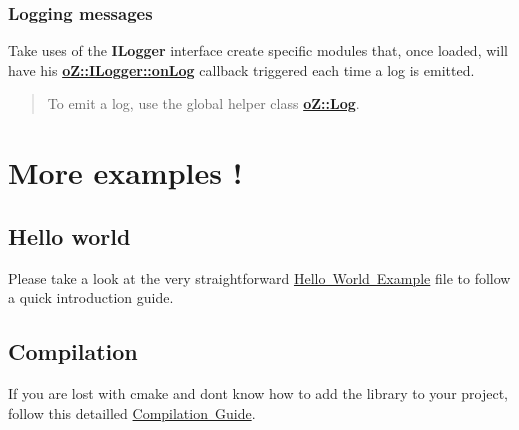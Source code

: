 \subsubsection*{Logging messages}

Take uses of the {\bfseries{I\+Logger}} interface create specific modules that, once loaded, will have his {\bfseries{\mbox{\hyperlink{classo_z_1_1_i_logger_a2e0e168c9218055e41bdd5b57177cba1}{o\+Z\+::\+I\+Logger\+::on\+Log}}}} callback triggered each time a log is emitted.

\begin{quote}
To emit a log, use the global helper class {\bfseries{\mbox{\hyperlink{classo_z_1_1_log}{o\+Z\+::\+Log}}}}. \end{quote}


\section*{More examples !}

\subsection*{Hello world}

Please take a look at the very straightforward \mbox{\hyperlink{md__h_e_l_l_o}{Hello World Example}} file to follow a quick introduction guide.

\subsection*{Compilation}

If you are lost with cmake and don\textquotesingle{}t know how to add the library to your project, follow this detailled \mbox{\hyperlink{md__c_o_m_p_i_l_a_t_i_o_n}{Compilation Guide}}. 